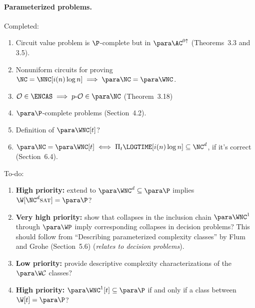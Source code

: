 \documentclass[draft]{article}
\newcommand{\dash}{\textnormal{-}}
\begin{document}
\paragraph{Parameterized problems.}
Completed:
\begin{enumerate}
\item Circuit value problem is $\P$-complete but in $\para \AC^{0 \uparrow}$ (Theorems~3.3 and 3.5).
\item Nonuniform circuits for proving $\NC = \NNC[i(n) \log n] \implies \para \NC = \para \WNC$.
\item $\mathcal{O} \in \ENCAS \implies p \dash \mathcal{O} \in \para \NC$ (Theorem~3.18)
\item $\para \P$-complete problems (Section~4.2).
\item Definition of $\para \WNC[t]$?
\item $\para\NC = \para \WNC[t] \iff \Pi_t\LOGTIME[i(n) \log n] \subseteq \NC^d$, if it's correct (Section~6.4).
\end{enumerate}
To-do:
\begin{enumerate}
\item \textbf{High priority:} extend \autocite[Corollary~3.8]{est15} to $\para \WNC^d \subseteq \para \P$ implies $\W[\NC^d \textsc{sat}] = \para \P$?
\item \textbf{Very high priority:} show that collapses in the inclusion chain $\para \WNC^1$ through $\para \WP$ imply corresponding collapses in decision problems? This should follow from ``Describing parameterized complexity classes'' by Flum and Grohe (Section~5.6) (\emph{relates to decision problems}).
\item \textbf{Low priority:} provide descriptive complexity characterizations of the $\para \W \mathcal{C}$ classes?
\item \textbf{High priority:} $\para \WNC^1[t] \subseteq \para \P$ if and only if a class between $\W[t] = \para \P$?
\end{enumerate}

\printbibliography
\end{document}
